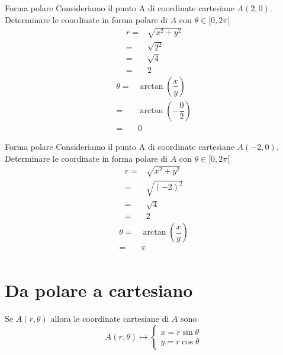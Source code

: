 \begin{esempiot}{Forma polare}{} Consideriamo il punto A di coordinate cartesiane $A(2,0)$. Determinare le coordinate in forma polare di $A$ con $\theta\in[0,2\pi[$
	\begin{align*}
	r=&\sqrt{x^2+y^2}\\
	=&\sqrt{2^2}\\
	=&\sqrt{4}\\
	=&2
	\end{align*}
	\begin{align*}
	\theta=&\arctan\left(\dfrac{x}{y}\right)\\
	=&\arctan\left(-\dfrac{0}{2}\right)\\
	=&0
	\end{align*}
\end{esempiot}
\begin{esempiot}{Forma polare}{} Consideriamo il punto A di coordinate cartesiane $A(-2,0)$. Determinare le coordinate in forma polare di $A$ con $\theta\in[0,2\pi[$
	\begin{align*}
	r=&\sqrt{x^2+y^2}\\
	=&\sqrt{(-2)^2}\\
	=&\sqrt{4}\\
	=&2
	\end{align*}
	\begin{align*}
	\theta=&\arctan\left(\dfrac{x}{y}\right)\\
	=&\pi\\
	\end{align*}
\end{esempiot}
\section{Da polare a cartesiano}
Se $A(r,\theta)$ allora le coordinate cartesiane di $A$ sono
\[ A(r,\theta)\mapsto \begin{cases}
x=r\sin\theta\\
y=r\cos\theta 
\end{cases} \]


